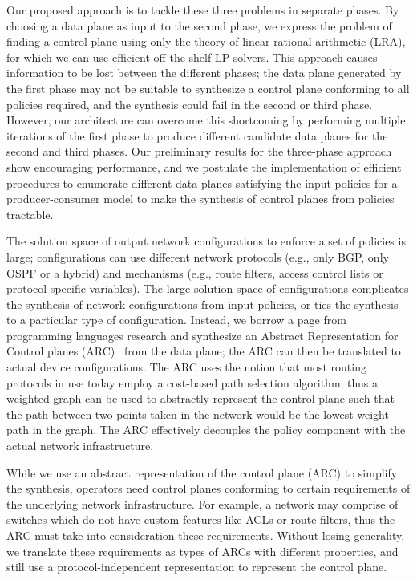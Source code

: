 Our proposed approach is to tackle these three problems in separate phases.
By choosing a data plane as input to the second phase, we 
express the problem of finding a control plane using only the 
theory of linear rational arithmetic (LRA), for which we can use
efficient off-the-shelf LP-solvers. 
This approach causes information to be lost between the different phases;
the data plane generated by the first phase may not be suitable to 
synthesize a control plane conforming to all policies required, and 
the synthesis could fail in the second or third phase. 
However, our architecture can overcome this shortcoming 
by performing
multiple iterations of the first phase to produce different 
candidate data planes for the second and third phases.
Our preliminary results for the three-phase
approach show encouraging performance, and we 
postulate the implementation of 
efficient procedures to enumerate different data 
planes satisfying the input policies for a 
producer-consumer model to make the synthesis of 
control planes from policies tractable.  


The solution space of output network configurations to 
enforce a set of policies
is large; configurations can use different 
network protocols (e.g., only BGP, only OSPF or a hybrid) and
mechanisms (e.g., route filters, access control lists
or protocol-specific variables). The large solution space
of configurations complicates the synthesis of
network configurations from
input policies, 
or ties the synthesis to a particular type of configuration. 
Instead, we borrow a page from programming languages
research and
synthesize an Abstract Representation for Control planes (ARC)~\cite{arc} 
from the data plane; the ARC can then be translated to actual device configurations.
The ARC uses the notion that most routing protocols in use 
today employ a cost-based path selection algorithm; thus a weighted
graph can be used to abstractly represent the control plane such that 
the path between two points taken in the network would be 
the lowest weight path in the graph. 
The ARC effectively decouples the policy component with the 
actual network infrastructure. 

While we use an abstract representation of the control
plane (ARC) to simplify the synthesis, operators need control 
planes conforming to certain requirements of the 
underlying network infrastructure. For example, a 
network may comprise of switches which do not have custom
features like ACLs or route-filters, thus the ARC must take 
into consideration these requirements. Without losing 
generality, we translate these 
requirements as types of ARCs with different properties,
and still use a protocol-independent representation
to represent the control plane. 


